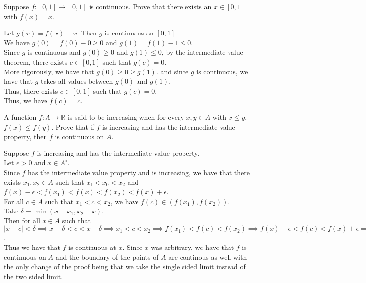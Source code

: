 \documentclass[answers,12pt,addpoints]{exam}
\begin{document}
\begin{questions}
    \question Suppose \(f : [0, 1] \to [0, 1]\) is continuous. Prove that there exists an \(x \in [0, 1]\) with \(f(x) = x\).
    \begin{solution}
        Let \(g(x) = f(x) - x\). Then \(g\) is continuous on \([0, 1]\).\\
        We have \(g(0) = f(0) - 0 \geq 0\) and \(g(1) = f(1) - 1 \leq 0\).\\
        Since \(g\) is continuous and \(g(0) \geq 0\) and \(g(1) \leq 0\), by the intermediate value theorem, there exists \(c \in [0, 1]\) such that \(g(c) = 0\).\\
        More rigorously, we have that $g(0) \geq 0 \geq g(1)$. and since $g$ is continuous, we have that $g$ takes all values between $g(0)$ and $g(1)$.\\
        Thus, there exists \(c \in [0, 1]\) such that \(g(c) = 0\).\\
        Thus, we have \(f(c) = c\).
    \end{solution}

    \question A function \(f : A \to \mathbb{R}\) is said to be increasing when for every \(x, y \in A\) with \(x \leq y\), \(f(x) \leq f(y)\). Prove that if \(f\) is increasing and has the intermediate value property, then \(f\) is continuous on \(A\).
    \begin{solution}
        Suppose $f$ is increasing and has the intermediate value property.\\
        Let $\epsilon >0$ and $x \in A^\circ$.\\
        Since $f$ has the intermediate value property and is increasing, we have that there exists $x_1, x_2 \in A$ such that $x_1 < x_0 < x_2$ and $f(x) - \epsilon < f(x_1) < f(x) < f(x_2) < f(x) + \epsilon$.\\
        For all $c \in A$ such that $x_1 < c < x_2$, we have $f(c) \in (f(x_1), f(x_2))$.\\
        Take $\delta = \min(x - x_1, x_2 - x)$.\\
        Then for all $x \in A$ such that $|x - c| < \delta \implies x-\delta < c < x - \delta \implies x_1 < c < x_2 \implies f(x_1) < f(c) < f(x_2) \implies f(x) - \epsilon < f(c) < f(x) + \epsilon \implies |f(x) - f(c)| < \epsilon$.\\
        Thus we have that $f$ is continuous at $x$.
        Since $x$ was arbitrary, we have that $f$ is continuous on $A$ and the boundary of the points of $A$ are continous as well with the only change of the proof being that we take the single sided limit instead of the two sided limit.
    \end{solution}
    
\end{questions}
\end{document}

